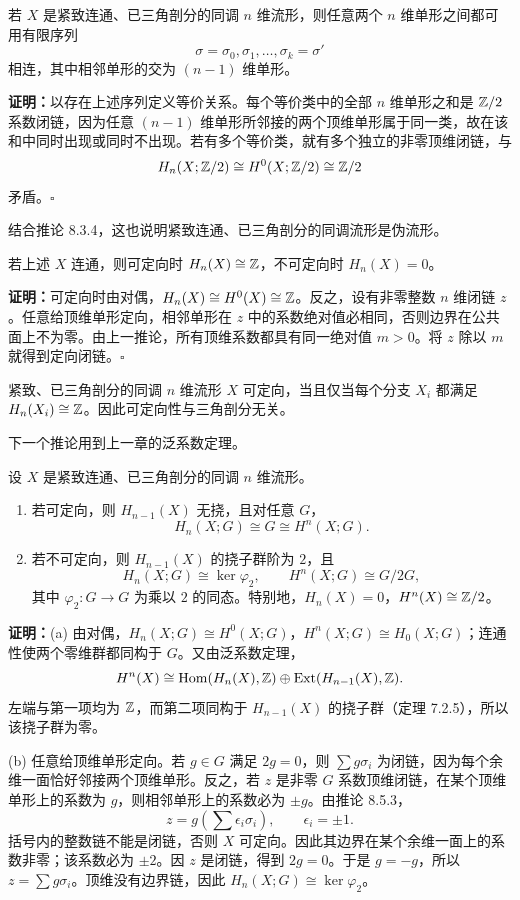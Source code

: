 若 $X$ 是紧致连通、已三角剖分的同调 $n$ 维流形，则任意两个 $n$ 维单形之间都可用有限序列
\[\sigma=\sigma_0,\sigma_1,\ldots,\sigma_k=\sigma'\]
相连，其中相邻单形的交为 $(n-1)$ 维单形。

\textbf{证明：}以存在上述序列定义等价关系。每个等价类中的全部 $n$ 维单形之和是 $\mathbb{Z}/2$ 系数闭链，因为任意 $(n-1)$ 维单形所邻接的两个顶维单形属于同一类，故在该和中同时出现或同时不出现。若有多个等价类，就有多个独立的非零顶维闭链，与
\[H_n(X;\mathbb{Z}/2)\cong H^0(X;\mathbb{Z}/2)\cong\mathbb{Z}/2\]
矛盾。\hfill$\square$

结合推论 8.3.4，这也说明紧致连通、已三角剖分的同调流形是伪流形。

若上述 $X$ 连通，则可定向时 $H_n(X)\cong\mathbb{Z}$，不可定向时 $H_n(X)=0$。

\textbf{证明：}可定向时由对偶，$H_n(X)\cong H^0(X)\cong\mathbb{Z}$。反之，设有非零整数 $n$ 维闭链 $z$。任意给顶维单形定向，相邻单形在 $z$ 中的系数绝对值必相同，否则边界在公共面上不为零。由上一推论，所有顶维系数都具有同一绝对值 $m>0$。将 $z$ 除以 $m$ 就得到定向闭链。\hfill$\square$

紧致、已三角剖分的同调 $n$ 维流形 $X$ 可定向，当且仅当每个分支 $X_i$ 都满足 $H_n(X_i)\cong\mathbb{Z}$。因此可定向性与三角剖分无关。

下一个推论用到上一章的泛系数定理。

设 $X$ 是紧致连通、已三角剖分的同调 $n$ 维流形。
\begin{enumerate}[label=(\alph*)]
\item 若可定向，则 $H_{n-1}(X)$ 无挠，且对任意 $G$，
\[H_n(X;G)\cong G\cong H^n(X;G).\]
\item 若不可定向，则 $H_{n-1}(X)$ 的挠子群阶为 $2$，且
\[H_n(X;G)\cong\ker\varphi_2,\qquad H^n(X;G)\cong G/2G,\]
其中 $\varphi_2:G\to G$ 为乘以 $2$ 的同态。特别地，$H_n(X)=0$，$H^n(X)\cong\mathbb{Z}/2$。
\end{enumerate}

\textbf{证明：}(a) 由对偶，$H_n(X;G)\cong H^0(X;G)$，$H^n(X;G)\cong H_0(X;G)$；连通性使两个零维群都同构于 $G$。又由泛系数定理，
\[H^n(X)\cong\operatorname{Hom}(H_n(X),\mathbb{Z})\oplus\operatorname{Ext}(H_{n-1}(X),\mathbb{Z}).\]
左端与第一项均为 $\mathbb{Z}$，而第二项同构于 $H_{n-1}(X)$ 的挠子群（定理 7.2.5），所以该挠子群为零。

(b) 任意给顶维单形定向。若 $g\in G$ 满足 $2g=0$，则 $\sum g\sigma_i$ 为闭链，因为每个余维一面恰好邻接两个顶维单形。反之，若 $z$ 是非零 $G$ 系数顶维闭链，在某个顶维单形上的系数为 $g$，则相邻单形上的系数必为 $\pm g$。由推论 8.5.3，
\[z=g\left(\sum\epsilon_i\sigma_i\right),\qquad\epsilon_i=\pm1.\]
括号内的整数链不能是闭链，否则 $X$ 可定向。因此其边界在某个余维一面上的系数非零；该系数必为 $\pm2$。因 $z$ 是闭链，得到 $2g=0$。于是 $g=-g$，所以 $z=\sum g\sigma_i$。顶维没有边界链，因此 $H_n(X;G)\cong\ker\varphi_2$。

